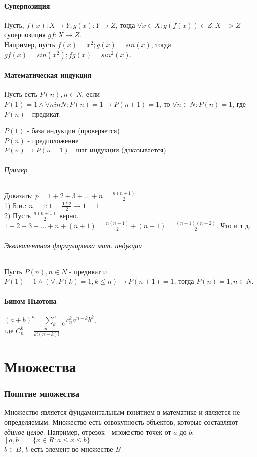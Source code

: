 \documentclass[10pt]{article}
\begin{document}
	\subsection{Суперпозиция}
		Пусть, $f(x) : X \to Y; g(x) : Y \to Z$, тогда $\forall x \in X : g(f(x)) \in Z : X -> Z$ суперпозиция $gf: X \to Z$.\\
		Например, пусть $f(x) = x^2; g(x) = sin(x)$, тогда $gf(x) = sin(x^2); fg(x) = sin^2(x)$.
	\subsection{Математическая индукция}
		Пусть есть $P(n), n \in N$,
		если $P(1) = 1 \wedge \forall n in N : P(n) = 1 \to P(n+1) = 1$,
		то $\forall n \in N : P(n) = 1$, где $P(n)$ - предикат.
	
		$P(1)$ - база индукции (проверяется)\\
		$P(n)$ - предположение\\
		$P(n) \to P(n+1)$ - шаг индукции (доказывается)
		
		\paragraph{Пример} Доказать: $p = 1 + 2 + 3 + \dots + n = \frac{n(n+1)}{2}$\\
		1) Б.и.: $n = 1: 1 = \frac{1*2}{2} \rightarrow 1 = 1$\\
		2) Пусть $\frac{n(n+1)}{2}$ верно.\\
		$1 + 2 + 3 + \dots + n + (n+1) = \frac{n(n+1)}{2} + (n+1) = \frac{(n+1)(n+2)}{2}$. Что и т.д.
		
		\paragraph{Эквивалентная формулировка мат. индукции}
		Пусть $P(n), n \in N$ - предикат и $P(1) - 1 \wedge (\forall:P(k) = 1, k \le n) \to P(n+1) = 1$, тогда 
		$P(n) = 1, n \in N$.
	\subsection{Бином Ньютона}
	$(a + b)^n = \sum\limits_{k = 0}^{n} c_{n}^{k}a^{n-k}b^{k}$, \\
	где $C_{n}^{k} = \frac{n!}{k!(n-k)!}$
\part{Множества}
	\section{Понятие множества}
		Множество является фундаментальным понятием в математике и является не определяемым. Множество есть
		совокупность объектов, которые составляют \textit{единое целое}.
		Например, отрезок - множество точек от $a$ до $b$: $[a, b] = \{x \in R : a \le x \le b\}$\\
		$b \in B$, $b$ есть элемент во множестве $B$
\end{document}
